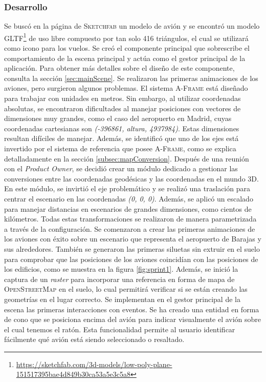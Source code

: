 \documentclass[a4paper, 11pt]{book}
\begin{document}
\subsubsection{Desarrollo}
Se buscó en la página de \textsc{Sketchfab} un modelo de avión y se encontró un modelo \textsc{GLTF}\footnote{\url{https://sketchfab.com/3d-models/low-poly-plane-151517395bae4d849b30ca53a5e3c5a8}} de uso libre compuesto por tan solo 416 triángulos, el cual se utilizará como icono para los vuelos.
Se creó el componente principal que sobrescribe el comportamiento de la escena principal y actúa como el gestor principal de la aplicación. Para obtener más detalles sobre el diseño de este componente, consulta la sección \ref{sec:mainScene}.
Se realizaron las primeras animaciones de los aviones, pero surgieron algunos problemas. El sistema \textsc{A-Frame} está diseñado para trabajar con unidades en metros. Sin embargo, al utilizar coordenadas absolutas, se encontraron dificultades al manejar posiciones con vectores de dimensiones muy grandes, como el caso del aeropuerto en Madrid, cuyas coordenadas cartesianas son \emph{(-396861, altura, 4937984)}. Estas dimensiones resultan difíciles de manejar. Además, se identificó que uno de los ejes está invertido por el sistema de referencia que posee \textsc{A-Frame}, como se explica detalladamente en la sección \ref{subsec:mapConversion}.
Después de una reunión con el \emph{Product Owner}, se decidió crear un módulo dedicado a gestionar las conversiones entre las coordenadas geodésicas y las coordenadas en el mundo \textsc{\gls{3D}}. En este módulo, se invirtió el eje problemático y se realizó una traslación para centrar el escenario en las coordenadas \emph{(0, 0, 0)}. Además, se aplicó un escalado para manejar distancias en escenarios de grandes dimensiones, como cientos de kilómetros. Todas estas transformaciones se realizaron de manera parametrizada a través de la configuración.
Se comenzaron a crear las primeras animaciones de los aviones con éxito sobre un escenario que representa el aeropuerto de Barajas y sus alrededores. 
También se generaron las primeras siluetas sin extruir en el suelo para comprobar que las posiciones de los aviones coincidían con las posiciones de los edificios, como se muestra en la figura \ref{fig:sprint1}.
Además, se inició la captura de un \emph{\gls{raster}} para incorporar una referencia en forma de mapa de \textsc{OpenStreetMap} en el suelo, lo cual permitirá verificar si se están creando las geometrías en el lugar correcto.
Se implementan en el gestor principal de la escena las primeras interacciones con eventos. Se ha creado una entidad en forma de cono que se posiciona encima del avión para indicar visualmente el avión sobre el cual tenemos el ratón. Esta funcionalidad permite al usuario identificar fácilmente qué avión está siendo seleccionado o resaltado.
\end{document}
